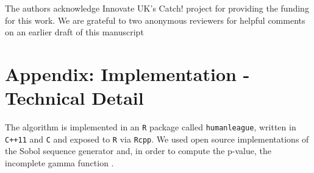\documentclass{JASSS}
\begin{document}
The authors acknowledge Innovate UK's Catch! project for providing the
funding for this work. We are grateful to two anonymous reviewers for helpful comments on an earlier draft of this manuscript







\endparano




\section{Appendix: Implementation - Technical Detail} 
The algorithm is implemented in an \texttt{R} package called
\texttt{humanleague}, written in \texttt{C++11} and \texttt{C} and
exposed to \texttt{R} via \texttt{Rcpp}. We used open source
implementations of the Sobol sequence generator \citep{johnson_stevengj/nlopt:_nodate} and, in order to 
compute the p-value, the
incomplete gamma function \citep{burkardt_asa032_2008}.
\end{document}
